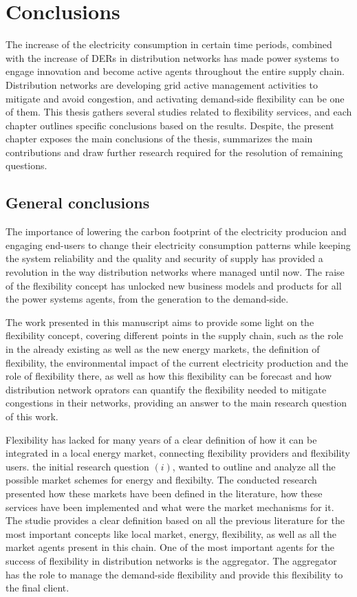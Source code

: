 
\chapter{Conclusions}
\label{conclus}
    The increase of the electricity consumption in certain time periods, combined with the increase of DERs in distribution networks has made power systems to engage innovation and become active agents throughout the entire supply chain. Distribution networks are developing grid active management activities to mitigate and avoid congestion, and activating demand-side flexibility can be one of them. 
    This thesis gathers several studies related to flexibility services, and each chapter outlines specific conclusions based on the results. Despite, the present chapter exposes the main conclusions of the thesis, summarizes the main contributions and draw further research required for the resolution of remaining questions. 

\section{General conclusions}
The importance of lowering the carbon footprint of the electricity producion and engaging end-users to change their electricity consumption patterns while keeping the system reliability and the quality and security of supply has provided a revolution in the way distribution networks where managed until now. The raise of the flexibility concept has unlocked new business models and products for all the power systems agents, from the generation to the demand-side.

The work presented in this manuscript aims to provide some light on the flexibility concept, covering different points in the supply chain, such as the role in the already existing as well as the new energy markets, the definition of flexibility, the environmental impact of the current electricity production and the role of flexibility there, as well as how this flexibility can be forecast and how distribution network oprators can quantify the flexibility needed to mitigate congestions in their networks, providing an answer to the main research question of this work. 

Flexibility has lacked for many years of a clear definition of how it can be integrated in a local energy market, connecting flexibility providers and flexibility users. the initial research question $(i)$, wanted to outline and analyze all the possible market schemes for energy and flexibilty. The conducted research presented how these markets have been defined in the literature, how these services have been implemented and what were the market mechanisms for it. The studie provides a clear definition based on all the previous literature for the most important concepts like local market, energy, flexibility, as well as all the market agents present in this chain. One of the most important agents for the success of flexibility in distribution networks is the aggregator. The aggregator has the role to manage the demand-side flexibility and provide this flexibility to the final client. 

